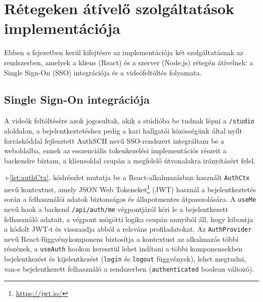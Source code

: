 \chapter{Rétegeken átívelő szolgáltatások implementációja}

Ebben a fejezetben kerül kifejtésre az implementációja két szolgáltatásnak az rendszerben, amelyek a kliens (React) és a szerver (Node.js) rétegén átívelnek: a Single Sign-On (SSO) integrációja és a videófeltöltés folyamata.

\section{Single Sign-On integrációja}

A videók feltöltésére azok jogosultak, akik a stúdióba be tudnak lépni a \verb|/studio| aloldalon, a bejelentkeztetéshez pedig a kari hallgatói közösségünk által nyílt forráskóddal fejlesztett AuthSCH nevű SSO-rendszert integráltam be a weboldalba, ennek az esszenciális tokenkezelési implementációs részeit a backendre bíztam, a kliensoldal csupán a megfelelő útvonalakra irányításért felel.

\Az+\ref{lst:authCtx}. kódrészlet mutatja be a React-alkalmazásban használt \verb|AuthCtx| nevű kontextust, amely JSON Web Tokeneket\footnote{\url{https://jwt.io/}} (JWT)\cite{jwt} használ a bejelentkeztetés során a felhasználói adatok biztonságos és állapotmentes átpasszolására. A \verb|useMe| nevű hook a backend \verb|/api/auth/me| végpontjáról kéri le a bejelentkezett felhasználó adatait, a végpont mögötti logika csupán annyiból áll, hogy kibontja a kódolt JWT-t és visszaadja abból a releváns profiladatokat. Az \verb|AuthProvider| nevű React-függvénykomponens biztosítja a kontextust az alkalmazás többi részének, a \verb|useAuth| hookon keresztül lehet indítani a többi komponensekben bejelentkezést és kijelentkezést (\verb|login| és \verb|logout| függvények), lehet megtudni, van-e bejelentkezett felhasználó a rendszerben (\verb|authenticated| boolean változó).

